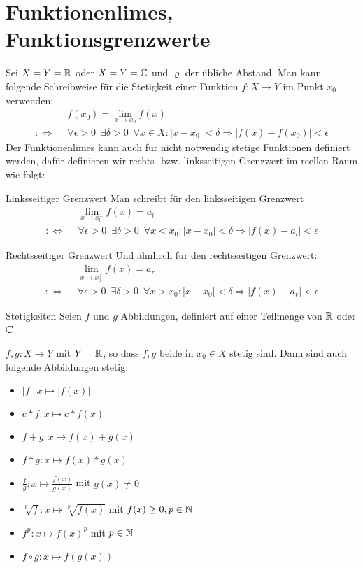 \section{Funktionenlimes, Funktionsgrenzwerte}
Sei $X=Y=\mathbb{R}$ oder $X=Y=\mathbb{C}$ und $\varrho$ der übliche Abstand. Man kann folgende Schreibweise für die Stetigkeit einer Funktion $f:X\rightarrow Y$ im Punkt $x_0$ verwenden:
\begin{align*}
	&f(x_0)=\lim\limits_{x\to x_0}f(x)\\
	:\Longleftrightarrow\enspace&\forall\epsilon>0 \enspace\exists\delta>0 \enspace\forall x\in X:|x-x_0|<\delta \Rightarrow |f(x)-f(x_0)|<\epsilon
\end{align*}
Der Funktionenlimes kann auch für nicht notwendig stetige Funktionen definiert werden, dafür definieren wir rechts- bzw. linksseitigen Grenzwert im reellen Raum wie folgt:
\begin{definition}{Linksseitiger Grenzwert}
	Man schreibt für den linksseitigen Grenzwert
	\begin{align*}
		&\lim\limits_{x\to x_0^-}f(x)=a_l\\
		:\Longleftrightarrow\enspace&\forall\epsilon>0 \enspace\exists\delta>0 \enspace\forall x<x_0:|x-x_0|<\delta \Rightarrow |f(x)-a_l|<\epsilon
	\end{align*}
\end{definition}
\begin{definition}{Rechtsseitiger Grenzwert}
	Und ähnlicch für den rechtsseitigen Grenzwert:
	\begin{align*}
		&\lim\limits_{x\to x_0^+}f(x)=a_r\\
		:\Longleftrightarrow\enspace&\forall\epsilon>0 \enspace\exists\delta>0 \enspace\forall x>x_0:|x-x_0|<\delta \Rightarrow |f(x)-a_r|<\epsilon
	\end{align*}
\end{definition}

\begin{satz}{Stetigkeiten}
	Seien $f$ und $g$ Abbildungen, definiert auf einer Teilmenge von $\mathbb{R}$ oder $\mathbb{C}$.

	$f,g:X\rightarrow Y$ mit $Y=\mathbb{R}$, so dass $f,g$ beide in $x_0\in X$ stetig sind. Dann sind auch folgende Abbildungen stetig:
	\begin{multicols}{2}
		\begin{itemize}
			\item $|f|:x\mapsto |f(x)|$
			\item $c*f:x\mapsto c*f(x)$
			\item $f+g:x\mapsto f(x)+g(x)$
			\item $f*g:x\mapsto f(x)*g(x)$
			\item $\displaystyle\frac{f}{g}:x\mapsto \frac{f(x)}{g(x)}$ mit $g(x)\neq 0$
			\item $\displaystyle\sqrt[p]{f}:x\mapsto \sqrt[p]{f(x)}$ mit $f(x)\geq 0, p\in\mathbb{N}$
			\item $\displaystyle f^p:x\mapsto f(x)^p$ mit $p\in\mathbb{N}$
			\item $f\circ g:x\mapsto f(g(x))$
		\end{itemize}
	\end{multicols}
\end{satz}

